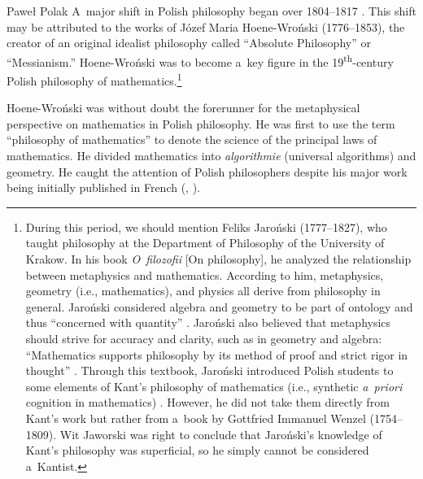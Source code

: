 \begin{artengenv}{Paweł Polak}
A~major shift in Polish philosophy began over 1804--1817
\parencites[i.e. with the rejection of the enlightenment's eclecticism see][]{tatarkiewicz_jakiej_1970}[][]{jaworski_z_1997}. %
 This shift may be attributed to the works of Józef Maria Hoene-Wroński (1776--1853), the creator of an original idealist philosophy called ``Absolute Philosophy'' or ``Messianism.'' Hoene-Wroński was to become a~key figure in the 19\textsuperscript{th}-century Polish philosophy of mathematics.\footnote{During this period, we should mention Feliks Jaroński (1777--1827), who taught philosophy at the Department of Philosophy of the University of Krakow. In his book \textit{O~filozofii} [On philosophy], he analyzed the relationship between metaphysics and mathematics. According to him, metaphysics, geometry (i.e., mathematics), and physics all derive from philosophy in general. Jaroński considered algebra and geometry to be part of ontology and thus ``concerned with quantity'' 
\parencite[][p.35]{jaronski_o_1812}. %
 Jaroński also believed that metaphysics should strive for accuracy and clarity, such as in geometry and algebra: ``Mathematics supports philosophy by its method of proof and strict rigor in thought'' 
\parencite[][p.48]{jaronski_o_1812}. %
 Through this textbook, Jaroński introduced Polish students to some elements of Kant's philosophy of mathematics (i.e., synthetic \textit{a~priori} cognition in mathematics) 
\parencite[][pp.156–157,~197]{jaronski_o_1812}. %
 However, he did not take them directly from Kant's work but rather from a~book by Gottfried Immanuel Wenzel (1754--1809). Wit Jaworski 
\parencites*[][p.52]{jaworski_z_1997}[similarly][p.193]{ziemba_jan_1872} %
 was right to conclude that Jaroński's knowledge of Kant's philosophy was superficial, so he simply cannot be considered a~Kantist.}

Hoene-Wroński was without doubt the forerunner for the metaphysical perspective on mathematics in Polish philosophy. He was first to use the term ``philosophy of mathematics'' to denote the science of the principal laws of mathematics. He divided mathematics into \textit{algorithmie} (universal algorithms) and geometry. He caught the attention of Polish philosophers despite his major work being initially published in French
(\cite[][]{hoene-wronski_introduction_1811}, \cite*[see also his English work:][p.14nn]{hoene-wronski_address_1820}).%



\end{artengenv}
